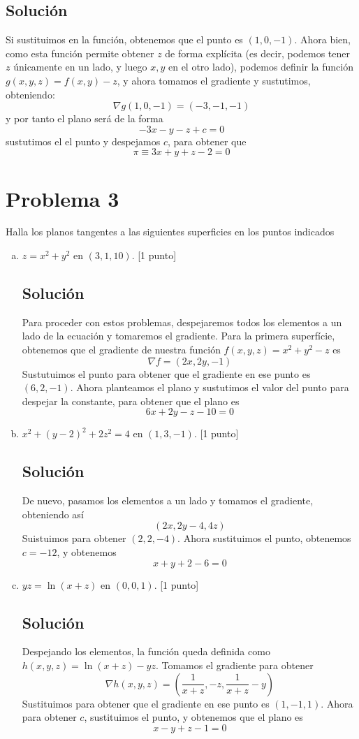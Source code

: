 \documentclass[12pt,reqno]{article}
\begin{document}
\begin{enumerate}[(a)]
		\subsection*{Solución}
		Si sustituimos en la función, obtenemos que el punto es $(1,0,-1)$. Ahora bien, como esta función permite obtener $z$ de forma explícita (es decir, podemos tener $z$ únicamente en un lado, y luego $x,y$ en el otro lado), podemos definir la función $g(x,y,z)=f(x,y)-z$, y ahora tomamos el gradiente y sustutimos, obteniendo:
		\[
			\nabla g(1,0,-1)=(-3,-1,-1)
		\]
		y por tanto el plano será de la forma
		\[
			-3x-y-z+c=0
		\]
		sustutimos el el punto y despejamos $c$, para obtener que
		\[
			\pi \equiv 3x+y+z-2=0
		\]
	\end{enumerate}
	
	\newpage
	
	\section*{Problema 3}
	Halla los planos tangentes a las siguientes superficies en los puntos indicados
	\begin{enumerate}[(a)]
		\item $z=x^2+y^2$ en $(3,1,10)$. [1 punto]
		\subsection*{Solución}
		Para proceder con estos problemas, despejaremos todos los elementos a un lado de la ecuación y tomaremos el gradiente. Para la primera superfície, obtenemos que el gradiente de nuestra función $f(x,y,z)=x^{2}+y^{2}-z$ es
		\[
			\nabla f=(2x,2y,-1)
		\]
		Sustutuimos el punto para obtener que el gradiente en ese punto es $(6,2,-1)$. Ahora planteamos el plano y sustutimos el valor del punto para despejar la constante, para obtener que el plano es
		\[
			6x+2y-z-10=0
		\]
		\item $x^2+(y-2)^2+2z^2=4$ en $(1,3,-1)$. [1 punto]
		\subsection*{Solución}
		De nuevo, pasamos los elementos a un lado y tomamos el gradiente, obteniendo así
		\[
			(2x,2y-4, 4z)
		\]
		Suistuimos para obtener $(2,2,-4)$. Ahora sustituimos el punto, obtenemos $c=-12$, y obtenemos
		\[
			x+y+2-6=0
		\]
	\item $yz=\ln(x+z)$ en $(0,0,1)$. [1 punto]
		\subsection*{Solución}
		Despejando los elementos, la función queda definida como $h(x,y,z)=\ln(x+z)-yz$. Tomamos el gradiente para obtener
		\[
			\nabla h(x,y,z)=(\frac{1}{x+z}, -z, \frac{1}{x+z}-y)
		\]
		Sustituimos para obtener que el gradiente en ese punto es $(1,-1,1)$. Ahora para obtener $c$, sustituimos el punto, y obtenemos que el plano es
		\[
			x-y+z-1=0
		\]
\end{enumerate}
\end{document}
